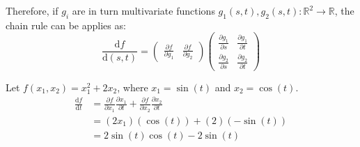 \begin{description}
        Therefore, if $g_i$ are in turn multivariate functions $g_1(s, t), g_2(s, t): \mathbb{R}^2 \rightarrow \mathbb{R}$,
        the chain rule can be applies as:
        \[
            \frac{\text{d}f}{\text{d}(s, t)} = 
            \begin{pmatrix}
                \frac{\partial f}{\partial g_1} & \frac{\partial f}{\partial g_2}
            \end{pmatrix}
            \begin{pmatrix}
                \frac{\partial g_1}{\partial s} & \frac{\partial g_1}{\partial t} \\ 
                \frac{\partial g_2}{\partial s} & \frac{\partial g_2}{\partial t}
            \end{pmatrix}
        \]

        \begin{example}
            Let $f(x_1, x_2) = x_1^2 + 2x_2$, where $x_1 = \sin(t)$ and $x_2 = \cos(t)$.
            \[
                \begin{split}
                    \frac{\text{d}f}{\text{d}t} & = 
                        \frac{\partial f}{\partial x_1}\frac{\partial x_1}{\partial t} + \frac{\partial f}{\partial x_2}\frac{\partial x_2}{\partial t} \\
                        & = (2x_1)(\cos(t)) + (2)(-\sin(t)) \\
                        & = 2\sin(t)\cos(t) - 2\sin(t)
                \end{split}
            \]
        \end{example}


\end{description}
